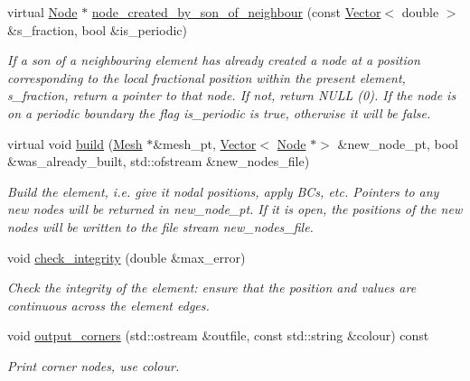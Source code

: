 \begin{DoxyCompactItemize}
virtual \hyperlink{classoomph_1_1Node}{Node} $\ast$ \hyperlink{classoomph_1_1RefineableQElement_3_012_01_4_ae989507794716d3ab8d0d2fd32dce28f}{node\+\_\+created\+\_\+by\+\_\+son\+\_\+of\+\_\+neighbour} (const \hyperlink{classoomph_1_1Vector}{Vector}$<$ double $>$ \&s\+\_\+fraction, bool \&is\+\_\+periodic)
\begin{DoxyCompactList}\small\item\em If a son of a neighbouring element has already created a node at a position corresponding to the local fractional position within the present element, s\+\_\+fraction, return a pointer to that node. If not, return N\+U\+LL (0). If the node is on a periodic boundary the flag is\+\_\+periodic is true, otherwise it will be false. \end{DoxyCompactList}\item 
virtual void \hyperlink{classoomph_1_1RefineableQElement_3_012_01_4_a8be1a217931d1054ab626ebd1adae182}{build} (\hyperlink{classoomph_1_1Mesh}{Mesh} $\ast$\&mesh\+\_\+pt, \hyperlink{classoomph_1_1Vector}{Vector}$<$ \hyperlink{classoomph_1_1Node}{Node} $\ast$$>$ \&new\+\_\+node\+\_\+pt, bool \&was\+\_\+already\+\_\+built, std\+::ofstream \&new\+\_\+nodes\+\_\+file)
\begin{DoxyCompactList}\small\item\em Build the element, i.\+e. give it nodal positions, apply B\+Cs, etc. Pointers to any new nodes will be returned in new\+\_\+node\+\_\+pt. If it is open, the positions of the new nodes will be written to the file stream new\+\_\+nodes\+\_\+file. \end{DoxyCompactList}\item 
void \hyperlink{classoomph_1_1RefineableQElement_3_012_01_4_a8f06b44d8fc378c3a3e256c9181e6b50}{check\+\_\+integrity} (double \&max\+\_\+error)
\begin{DoxyCompactList}\small\item\em Check the integrity of the element\+: ensure that the position and values are continuous across the element edges. \end{DoxyCompactList}\item 
void \hyperlink{classoomph_1_1RefineableQElement_3_012_01_4_ac14c3c0281921b093497b76f0f51064a}{output\+\_\+corners} (std\+::ostream \&outfile, const std\+::string \&colour) const
\begin{DoxyCompactList}\small\item\em Print corner nodes, use colour. \end{DoxyCompactList}\item 
$$
\end{DoxyCompactItemize}
